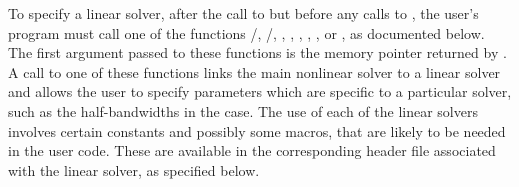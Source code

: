 To specify a {\kinsol} linear solver, after the call to 
but before any calls to , the user's program must call one of
the functions /, /,
, , , , , or
, as documented below. 
The first argument passed to these functions is the {\kinsol}
memory pointer returned by . A call to one of these
functions links the main {\kinsol} nonlinear solver to a linear solver and
allows the user to specify parameters which are specific to a
particular solver, such as the half-bandwidths in the {\kinband} case.
The use of each of the linear solvers involves certain constants and possibly 
some macros, that are likely to be needed in the user code.  These are
available in the corresponding header file associated with the linear
solver, as specified below.

